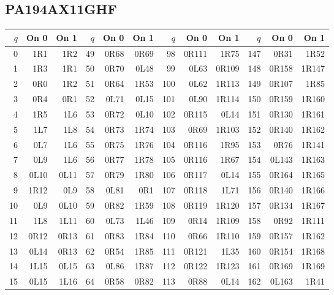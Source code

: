 \subsection{PA194AX11GHF}
\begingroup\scriptsize
\setlength{\tabcolsep}{5pt}
\renewcommand{\arraystretch}{1.07}
\begin{center}
\begin{tabular}{rrr@{\hspace{7mm}}rrr@{\hspace{7mm}}rrr@{\hspace{7mm}}rrr}
\toprule
$q$ & On 0 & On 1 & $q$ & On 0 & On 1 & $q$ & On 0 & On 1 & $q$ & On 0 & On 1 \\
\midrule
0 & 1R1 & 1R2 & 49 & 0R68 & 0R69 & 98 & 0R111 & 1R75 & 147 & 0R31 & 1R52 \\
1 & 1R3 & 1R1 & 50 & 0R70 & 0L48 & 99 & 0L63 & 0R109 & 148 & 0R158 & 1R147 \\
2 & 0R0 & 1R2 & 51 & 0R64 & 1R53 & 100 & 0L62 & 1R113 & 149 & 0R107 & 1R85 \\
3 & 0R4 & 0R1 & 52 & 0L71 & 0L15 & 101 & 0L90 & 1R114 & 150 & 0R159 & 1R160 \\
4 & 1R5 & 1L6 & 53 & 0R72 & 0L10 & 102 & 0R115 & 0L14 & 151 & 0R130 & 1R161 \\
5 & 1L7 & 1L8 & 54 & 0R73 & 1R74 & 103 & 0R69 & 1R103 & 152 & 0R140 & 1R162 \\
6 & 0L7 & 1L6 & 55 & 0R75 & 1R76 & 104 & 0R116 & 1R95 & 153 & 0R76 & 1R141 \\
7 & 0L9 & 1L6 & 56 & 0R77 & 1R78 & 105 & 0R116 & 1R67 & 154 & 0L143 & 1R163 \\
8 & 0L10 & 0L11 & 57 & 0R79 & 1R80 & 106 & 0R117 & 0L14 & 155 & 0R164 & 1R165 \\
9 & 1R12 & 0L9 & 58 & 0L81 & 0R1 & 107 & 0R118 & 1L71 & 156 & 0R140 & 1R166 \\
10 & 0L9 & 0L10 & 59 & 0R82 & 1R59 & 108 & 0R119 & 1R120 & 157 & 0R134 & 1R167 \\
11 & 1L8 & 1L11 & 60 & 0L73 & 1L46 & 109 & 0R14 & 1R109 & 158 & 0R92 & 1R111 \\
12 & 0R12 & 0R13 & 61 & 0R83 & 1R84 & 110 & 0R66 & 1R110 & 159 & 0R157 & 1R162 \\
13 & 0L14 & 0R13 & 62 & 0R54 & 1R85 & 111 & 0R121 & 1L35 & 160 & 0R154 & 1R168 \\
14 & 1L15 & 0L15 & 63 & 0L86 & 1R87 & 112 & 0R122 & 1R123 & 161 & 0R169 & 1R169 \\
15 & 0L15 & 1L16 & 64 & 0R58 & 0R82 & 113 & 0R88 & 0L14 & 162 & 0L163 & 1R41 \\

\end{tabular}
\end{center}
